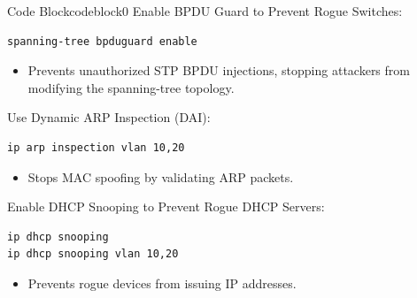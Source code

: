 \documentclass[a4paper]{article}
\begin{document}
\begin{enumerate}
\begin{ocg}{Code Block}{codeblock}{0}
		      Enable BPDU Guard to Prevent Rogue Switches:
		      \begin{lstlisting}
spanning-tree bpduguard enable
            \end{lstlisting}

		      \begin{itemize}
			      \item \small Prevents unauthorized STP BPDU injections, stopping attackers from modifying the spanning-tree topology.
		      \end{itemize}
		      \vspace{1cm}

		      Use Dynamic ARP Inspection (DAI):
		      \begin{lstlisting}
ip arp inspection vlan 10,20
            \end{lstlisting}

		      \begin{itemize}
			      \item \small Stops MAC spoofing by validating ARP packets.
		      \end{itemize}
		      \vspace{1cm}


		      Enable DHCP Snooping to Prevent Rogue DHCP Servers:
		      \begin{lstlisting}
ip dhcp snooping
ip dhcp snooping vlan 10,20
            \end{lstlisting}

		      \begin{itemize}
			      \item \small Prevents rogue devices from issuing IP addresses.
		      \end{itemize}

		      \vspace{0.5cm}
	      \end{ocg}
\end{enumerate}
\end{document}
